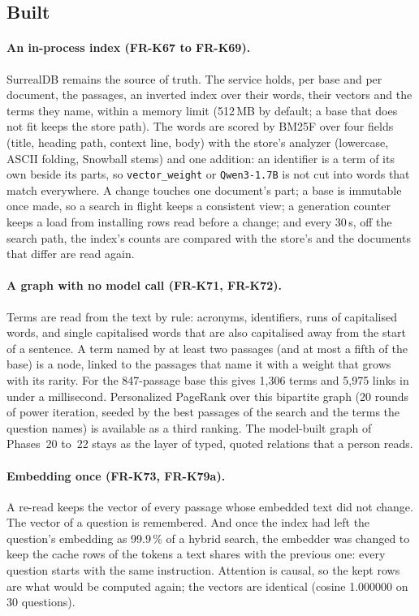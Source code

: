 \subsection{Built}

\paragraph{An in-process index (FR-K67 to FR-K69).} SurrealDB remains the source of truth. The service holds, per base and per document, the passages, an
inverted index over their words, their vectors and the terms they name, within a memory limit (512\,MB by default; a base that does not fit keeps the store path).
The words are scored by BM25F over four fields (title, heading path, context line, body) with the store's analyzer (lowercase, ASCII folding, Snowball stems) and one
addition: an identifier is a term of its own beside its parts, so \texttt{vector\_weight} or \texttt{Qwen3-1.7B} is not cut into words that match everywhere. A
change touches one document's part; a base is immutable once made, so a search in flight keeps a consistent view; a generation counter keeps a load from installing
rows read before a change; and every 30\,s, off the search path, the index's counts are compared with the store's and the documents that differ are read again.

\paragraph{A graph with no model call (FR-K71, FR-K72).} Terms are read from the text by rule: acronyms, identifiers, runs of capitalised words, and single
capitalised words that are also capitalised away from the start of a sentence. A term named by at least two passages (and at most a fifth of the base) is a node,
linked to the passages that name it with a weight that grows with its rarity. For the 847-passage base this gives 1{,}306 terms and 5{,}975 links in under a
millisecond. Personalized PageRank over this bipartite graph (20 rounds of power iteration, seeded by the best passages of the search and the terms the question
names) is available as a third ranking. The model-built graph of Phases~20 to~22 stays as the layer of typed, quoted relations that a person reads.

\paragraph{Embedding once (FR-K73, FR-K79a).} A re-read keeps the vector of every passage whose embedded text did not change. The vector of a question is
remembered. And once the index had left the question's embedding as 99.9\,\% of a hybrid search, the embedder was changed to keep the cache rows of the tokens a
text shares with the previous one: every question starts with the same instruction. Attention is causal, so the kept rows are what would be computed again; the
vectors are identical (cosine 1.000000 on 30 questions).


